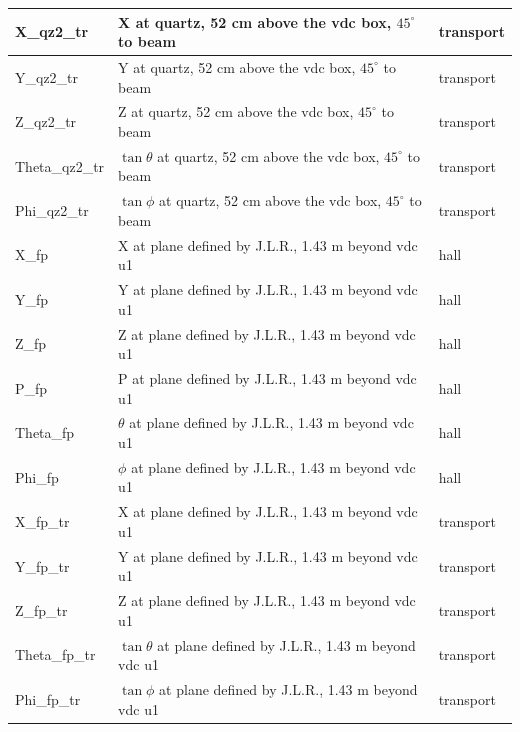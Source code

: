 \documentclass[11pt]{amsart}
\begin{document}
\begin{longtable}{| l | l | l |}
X\_qz2\_tr           & X at quartz, 52 cm above the vdc box, $45^\circ$ to beam  & transport\\
\hline
Y\_qz2\_tr           & Y at quartz, 52 cm above the vdc box, $45^\circ$ to beam  & transport\\
\hline
Z\_qz2\_tr           & Z at quartz, 52 cm above the vdc box, $45^\circ$ to beam  & transport\\
\hline
Theta\_qz2\_tr       & $\tan{\theta}$ at quartz, 52 cm above the vdc box, $45^\circ$ to beam  & transport\\
\hline
Phi\_qz2\_tr         & $\tan{\phi}$ at quartz, 52 cm above the vdc box, $45^\circ$ to beam  & transport\\
\hline
\hline
X\_fp              & X at plane defined by J.L.R., 1.43 m beyond vdc u1  & hall \\
\hline
Y\_fp              & Y at plane defined by J.L.R., 1.43 m beyond vdc u1  & hall \\
\hline
Z\_fp              & Z at plane defined by J.L.R., 1.43 m beyond vdc u1  & hall \\
\hline
P\_fp              & P at plane defined by J.L.R., 1.43 m beyond vdc u1  & hall \\
\hline
Theta\_fp          & $\theta$ at plane defined by J.L.R., 1.43 m beyond vdc u1  & hall \\
\hline
Phi\_fp            & $\phi$ at plane defined by J.L.R., 1.43 m beyond vdc u1  & hall \\
\hline
X\_fp\_tr           & X at plane defined by J.L.R., 1.43 m beyond vdc u1  & transport\\
\hline
Y\_fp\_tr           & Y at plane defined by J.L.R., 1.43 m beyond vdc u1  & transport\\
\hline
Z\_fp\_tr           & Z at plane defined by J.L.R., 1.43 m beyond vdc u1  & transport\\
\hline
Theta\_fp\_tr       & $\tan{\theta}$ at plane defined by J.L.R., 1.43 m beyond vdc u1  & transport\\
\hline
Phi\_fp\_tr         & $\tan{\phi}$ at plane defined by J.L.R., 1.43 m beyond vdc u1  & transport\\
\hline

\end{longtable}
\end{document}
